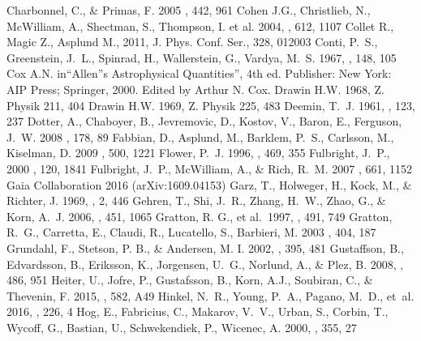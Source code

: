 \documentclass[revtex4]{emulateapj}
\begin{document}
\begin{thebibliography}{1}
 Charbonnel, C., \& Primas, F. 2005 \aap, 442, 961
 Cohen J.G., Christlieb, N., McWilliam, A., Shectman, S.,
Thompson, I. et al. 2004, \apj, 612, 1107
 Collet R., Magic Z., Asplund M., 2011, J. Phys. Conf. Ser., 328, 012003
 Conti, P.~S., Greenstein, J.~L., Spinrad, H., Wallerstein, G., Vardya, M.~S. 1967, \apj, 148, 105
 Cox A.N. in``Allen''s Astrophysical Quantities'', 4th ed.  Publisher: New York: AIP Press; Springer, 2000. Edited by Arthur N. Cox. 
 Drawin H.W. 1968, Z. Physik 211, 404
 Drawin H.W. 1969, Z. Physik 225, 483
 Deemin, T.~J. 1961, \mnras, 123, 237
 Dotter, A., Chaboyer, B., Jevremovic, D., Kostov, V., Baron, E., Ferguson, J.~W. 2008 \apjs, 178, 89
 Fabbian, D., Asplund, M., Barklem, P.~S., Carlsson, M., Kiselman, D. 2009 \aap, 500, 1221 
 Flower, P.~J. 1996, \apj, 469, 355
 Fulbright, J.~P., 2000 \aj, 120, 1841
 Fulbright, J.~P., McWilliam, A., \& Rich, R.~M. 2007 \apj, 661, 1152
 Gaia Collaboration 2016 (arXiv:1609.04153)
 Garz, T., Holweger, H., Kock, M., \& Richter, J. 1969, \aap, 2, 446
 Gehren, T., Shi, J.~R., Zhang, H.~W., Zhao, G., \& Korn, A.~J. 2006, \aap, 451, 1065
 Gratton, R. G., et al.\ 1997, \apj, 491, 749
 Gratton, R.~G., Carretta, E., Claudi, R., Lucatello, S., Barbieri, M. 2003 \aap, 404, 187
Grundahl, F., Stetson, P. B., \& Andersen, M. I. 2002, \aap, 395, 481
Gustaffson, B., Edvardsson, B., Eriksson, K., Jorgensen, U.~G., Norlund, A., \& Plez, B. 2008, \aap, 486, 951
 Heiter, U., Jofre, P., Gustafsson, B., Korn, A.J., Soubiran, C., \& Thevenin, F. 2015, \aap, 582, A49
 Hinkel, N.~R., Young, P.~A., Pagano, M.~D., et~al. 2016, \apjs, 226, 4
 Hog, E., Fabricius, C., Makarov, V.~V., Urban, S., Corbin, T., Wycoff, G., Bastian, U., Schwekendiek, P., Wicenec, A. 2000, \aap, 355, 27 

\end{thebibliography}
\end{document}
